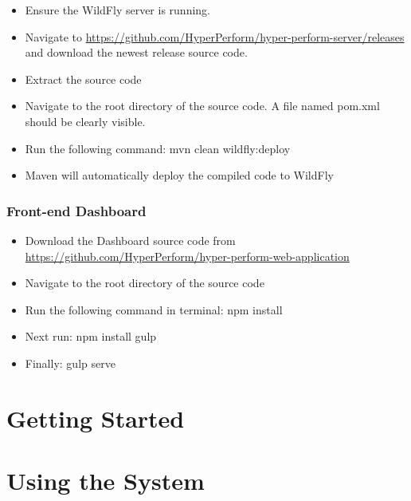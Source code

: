 \documentclass[11pt,a4paper]{article}
\begin{document}
\begin{itemize}
	\item Ensure the WildFly server is running.
	\item Navigate to \url{https://github.com/HyperPerform/hyper-perform-server/releases} and download the newest release source code.
	\item Extract the source code
	\item Navigate to the root directory of the source code. A file named pom.xml should be clearly visible.
	\item Run the following command: mvn clean wildfly:deploy
	\item Maven will automatically deploy the compiled code to WildFly
\end{itemize}



\subsubsection{Front-end Dashboard}

\begin{itemize}
	\item Download the Dashboard source code from \url{https://github.com/HyperPerform/hyper-perform-web-application}
	\item Navigate to the root directory of the source code
	\item Run the following command in terminal: npm install
	\item Next run: npm install gulp
	\item Finally: gulp serve
\end{itemize}


%
%

\section{Getting Started}

\section{Using the System}
\end{document}
